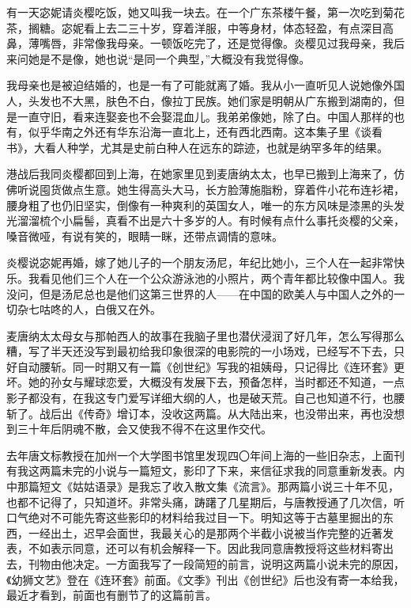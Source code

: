 \par 有一天宓妮请炎樱吃饭，她又叫我一块去。在一个广东茶楼午餐，第一次吃到菊花茶，搁糖。宓妮看上去二三十岁，穿着洋服，中等身材，体态轻盈，有点深目高鼻，薄嘴唇，非常像我母亲。一顿饭吃完了，还是觉得像。炎樱见过我母亲，我后来问她是不是像，她也说“是同一个典型，”大概没有我觉得像。
\par 我母亲也是被迫结婚的，也是一有了可能就离了婚。我从小一直听见人说她像外国人，头发也不大黑，肤色不白，像拉丁民族。她们家是明朝从广东搬到湖南的，但是一直守旧，看来连娶妾也不会娶混血儿。我弟弟像她，除了白。中国人那样的也有，似乎华南之外还有华东沿海一直北上，还有西北西南。这本集子里《谈看书》，大看人种学，尤其是史前白种人在远东的踪迹，也就是纳罕多年的结果。
\par 港战后我同炎樱都回到上海，在她家里见到麦唐纳太太，也早已搬到上海来了，仿佛听说囤货做点生意。她生得高头大马，长方脸薄施脂粉，穿着件小花布连衫裙，腰身粗了也仍旧坚实，倒像有一种爽利的英国女人，唯一的东方风味是漆黑的头发光溜溜梳个小扁髻，真看不出是六十多岁的人。有时候有点什么事托炎樱的父亲，嗓音微哑，有说有笑的，眼睛一眯，还带点调情的意味。
\par 炎樱说宓妮再婚，嫁了她儿子的一个朋友汤尼，年纪比她小，三个人在一起非常快乐。我看见他们三个人在一个公众游泳池的小照片，两个青年都比较像中国人。我没问，但是汤尼总也是他们这第三世界的人——在中国的欧美人与中国人之外的一切杂七咕咚的人，白俄又在外。
\par 麦唐纳太太母女与那帕西人的故事在我脑子里也潜伏浸润了好几年，怎么写得那么糟，写了半天还没写到最初给我印象很深的电影院的一小场戏，已经写不下去，只好自动腰斩。同一时期又有一篇《创世纪》写我的祖姨母，只记得比《连环套》更坏。她的孙女与耀球恋爱，大概没有发展下去，预备怎样，当时都还不知道，一点影子都没有，在我这专门爱写详细大纲的人，也是破天荒。自己也知道不行，也腰斩了。战后出《传奇》增订本，没收这两篇。从大陆出来，也没带出来，再也没想到三十年后阴魂不散，会又使我不得不在这里作交代。
\par 去年唐文标教授在加州一个大学图书馆里发现四〇年间上海的一些旧杂志，上面刊有我这两篇未完的小说与一篇短文，影印了下来，来信征求我的同意重新发表。内中那篇短文《姑姑语录》是我忘了收入散文集《流言》。那两篇小说三十年不见，也都不记得了，只知道坏。非常头痛，踌躇了几星期后，与唐教授通了几次信，听口气绝对不可能先寄这些影印的材料给我过目一下。明知这等于古墓里掘出的东西，一经出土，迟早会面世，我最关心的是那两个半截小说被当作完整的近著发表，不如表示同意，还可以有机会解释一下。因此我同意唐教授将这些材料寄出去，刊物由他决定。一方面我写了一段简短的前言，说明这两篇小说未完的原因，《幼狮文艺》登在《连环套》前面。《文季》刊出《创世纪》后也没有寄一本给我，最近才看到，前面也有删节了的这篇前言。
